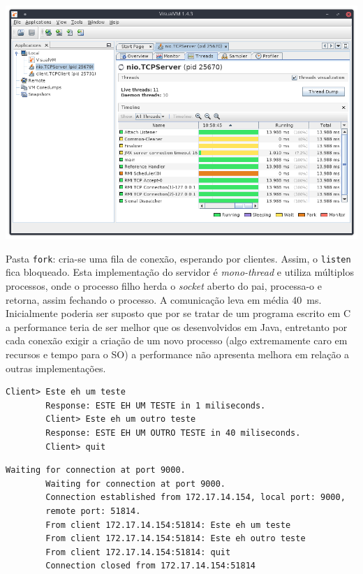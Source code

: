 \documentclass[a4paper, 12pt, answers]{exam}
\begin{document}
\begin{questions}
\begin{parts}
\begin{solution}
        \includegraphics[width = \linewidth]{visualvm-03.png}
        \vspace{1em}
        
        Pasta \verb|fork|: cria-se uma fila de conexão, esperando por clientes.
        Assim, o \verb|listen| fica bloqueado. Esta implementação do servidor
        é \emph{mono-thread} e utiliza múltiplos processos, onde o processo 
        filho herda o \emph{socket} aberto do pai, processa-o e retorna,
        assim fechando o processo. A comunicação leva em média
        \SI{40}{\milli\second}. Inicialmente poderia ser suposto que por 
        se tratar de um programa escrito em C a performance teria de ser
        melhor que os desenvolvidos em Java, entretanto por cada conexão
        exigir a criação de um novo processo (algo extremamente caro em 
        recursos e tempo para o SO) a performance não apresenta melhora
        em relação a outras implementações.
        
        \begin{Verbatim}[label={\$ java client.TCPClient}]
        Client> Este eh um teste
        Response: ESTE EH UM TESTE in 1 miliseconds.
        Client> Este eh um outro teste
        Response: ESTE EH UM OUTRO TESTE in 40 miliseconds.
        Client> quit
        \end{Verbatim}
        
        \begin{Verbatim}[label={\$ ./fork/fork}]
        Waiting for connection at port 9000. 
        Waiting for connection at port 9000. 
        Connection established from 172.17.14.154, local port: 9000, 
        remote port: 51814.
        From client 172.17.14.154:51814: Este eh um teste
        From client 172.17.14.154:51814: Este eh outro teste
        From client 172.17.14.154:51814: quit
        Connection closed from 172.17.14.154:51814
        \end{Verbatim}
        

\end{solution}
\end{parts}
\end{questions}
\end{document}
